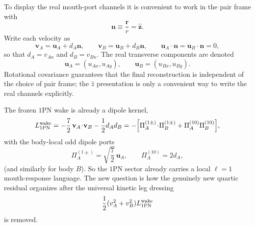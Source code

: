 \documentclass[11pt]{article}
\newcommand{\OnePN}{\mathrm{1PN}}
\begin{document}
To display the real mouth-port channels it is convenient to work in the pair frame with
\begin{equation}
\mathbf n\equiv \frac{\mathbf r}{r}=\hat{\mathbf z}.
\label{eq:mouth-port-nz}
\end{equation}
Write each velocity as
\begin{equation}
\mathbf v_A=\mathbf u_A+d_A\mathbf n,
\qquad
\mathbf v_B=\mathbf u_B+d_B\mathbf n,
\qquad
\mathbf u_A\!\cdot\!\mathbf n=\mathbf u_B\!\cdot\!\mathbf n=0,
\label{eq:mouth-port-velocity-split}
\end{equation}
so that \(d_A=v_{An}\) and \(d_B=v_{Bn}\).
The real transverse components are denoted
\begin{equation}
\mathbf u_A=(u_{Ax},u_{Ay}),
\qquad
\mathbf u_B=(u_{Bx},u_{By}).
\label{eq:mouth-port-transverse-components}
\end{equation}
Rotational covariance guarantees that the final reconstruction is independent of the
choice of pair frame; the \(\hat z\) presentation is only a convenient way to write the
real channels explicitly.

The frozen \(\OnePN\) wake is already a dipole kernel,
\begin{equation}
L^{\rm wake}_{1\mathrm{PN}}
=-\frac72\,\mathbf v_A\!\cdot\!\mathbf v_B-\frac12 d_A d_B
=-\Bigl[\Pi_A^{(1\pm)}\!\cdot\!\Pi_B^{(1\pm)}+\Pi_A^{(10)}\Pi_B^{(10)}\Bigr],
\label{eq:mouth-port-1pn-wake}
\end{equation}
with the body-local odd dipole ports
\begin{equation}
\Pi_A^{(1\pm)}=\sqrt{\frac72}\,\mathbf u_A,
\qquad
\Pi_A^{(10)}=2d_A,
\label{eq:mouth-port-odd-ports-A}
\end{equation}
(and similarly for body \(B\)).
So the \(\OnePN\) sector already carries a local \(\ell=1\) mouth-response language.
The new question is how the genuinely new quartic residual organizes after the universal
kinetic leg dressing
\begin{equation}
\frac12(v_A^2+v_B^2)L^{\rm wake}_{1\mathrm{PN}}
\label{eq:mouth-port-leg-dressing}
\end{equation}
is removed.
\end{document}
